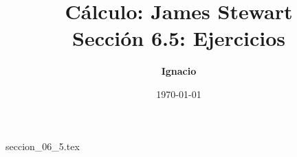 \documentclass[11pt,spanish,oneside]{report}
\title{\textbf{Cálculo: James Stewart} \\ \Large Sección 6.5: Ejercicios}
\author{\textbf{Ignacio}}
\date{\today}
\begin{document}
\maketitle

{seccion_06_5.tex}
\end{document}
